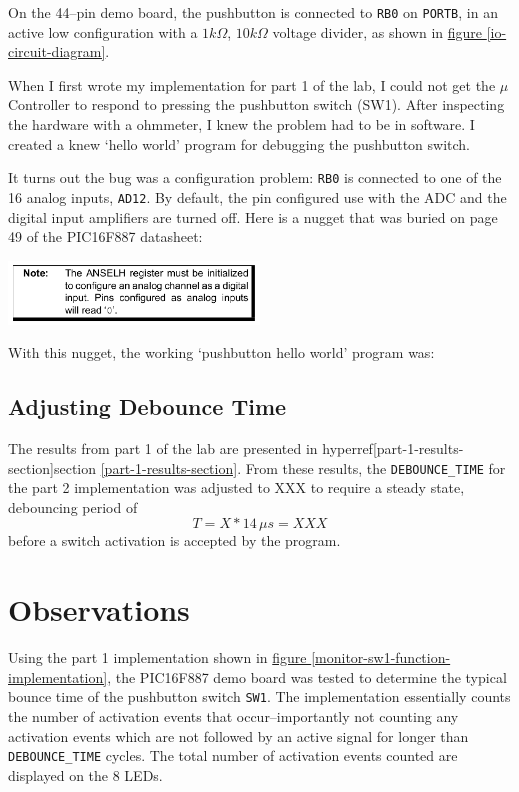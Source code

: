 \documentclass[11pt]{article}
\begin{document}
On the 44--pin demo board, the pushbutton is connected to \texttt{RB0}
on \texttt{PORTB}, in an active low configuration with a $1k\Omega$, $10k\Omega$
voltage divider, as shown in \hyperref[io-circuit-diagram]{figure \ref{io-circuit-diagram}}.

When I first wrote my implementation for part 1 of the lab,
I could not get the $\mu$Controller to respond to pressing the
pushbutton switch (SW1). After inspecting the hardware with a ohmmeter,
I knew the problem had to be in software. I created a knew `hello world'
program for debugging the pushbutton switch.

It turns out the bug was a configuration problem: \texttt{RB0} is connected
to one of the 16 analog inputs, \texttt{AD12}. By default, the pin configured
use with the ADC and the digital input amplifiers are turned off.
Here is a nugget that was buried on page 49 of the PIC16F887 datasheet:
\begin{center}
	\includegraphics[width=0.5\textwidth]{Figures/port-b-configuration-note.pdf}
\end{center}
With this nugget, the working `pushbutton hello world' program was:


\subsection{Adjusting Debounce Time}

The results from part 1 of the lab are presented in
hyperref[part-1-results-section]{section \ref{part-1-results-section}}.
From these results, the \texttt{DEBOUNCE\_TIME} for the part 2 implementation
was adjusted to XXX to require a steady state, debouncing period of
\begin{equation*}
T=X*14\, \mu s=XXX
\end{equation*}
before a switch activation is accepted by the program.

\section{Observations}

Using the part 1 implementation shown in
\hyperref[monitor-sw1-function-implementation]{figure \ref{monitor-sw1-function-implementation}},
the PIC16F887 demo board was tested to determine the typical bounce time of
the pushbutton switch \texttt{SW1}. The implementation essentially counts the
number of activation events that occur--importantly not counting any activation events
which are not followed by an active signal for longer than \texttt{DEBOUNCE\_TIME} cycles.
The total number of activation events counted are displayed on the 8 LEDs.
\end{document}
